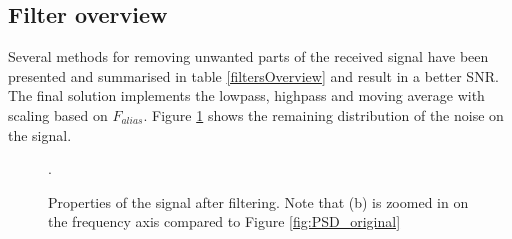 \subsection{Filter overview}
Several methods for removing unwanted parts of the received signal have been presented and summarised in table \ref{filtersOverview} and result in a better SNR. The final solution implements the lowpass, highpass and moving average with scaling based on $F_{alias}$. Figure \ref{Signal_properties_post_filter} shows the remaining distribution of the noise on the signal.

\begin{figure}
	\centering     %
	\caption{Properties of the signal after filtering. Note that (b) is zoomed in on the frequency axis compared to Figure \ref{fig:PSD_original}\label{Signal_properties_post_filter}}.
\end{figure}

